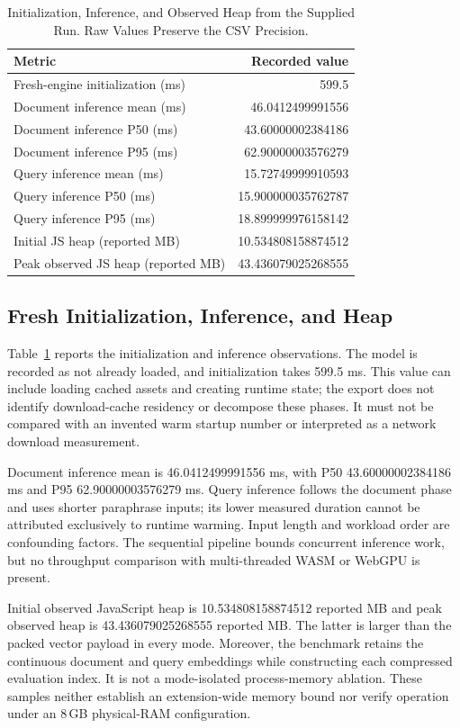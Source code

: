 \documentclass[conference]{IEEEtran}
\newcommand{\mInitialization}{599.5}
\newcommand{\mDocMean}{46.0412499991556}
\newcommand{\mDocMedian}{43.60000002384186}
\newcommand{\mDocTail}{62.90000003576279}
\newcommand{\mQueryMean}{15.72749999910593}
\newcommand{\mQueryMedian}{15.900000035762787}
\newcommand{\mQueryTail}{18.899999976158142}
\newcommand{\mInitialHeap}{10.534808158874512}
\newcommand{\mPeakHeap}{43.436079025268555}
\begin{document}
\begin{table}[!t]
\caption{Initialization, Inference, and Observed Heap from the Supplied Run. Raw Values Preserve the CSV Precision.}
\label{tab:runtime}
\centering
\footnotesize
\setlength{\tabcolsep}{3pt}
\begin{tabular}{@{}lr@{}}
\toprule
Metric & Recorded value\\
\midrule
Fresh-engine initialization (ms) & \mInitialization\\
Document inference mean (ms) & \mDocMean\\
Document inference P50 (ms) & \mDocMedian\\
Document inference P95 (ms) & \mDocTail\\
Query inference mean (ms) & \mQueryMean\\
Query inference P50 (ms) & \mQueryMedian\\
Query inference P95 (ms) & \mQueryTail\\
Initial JS heap (reported MB) & \mInitialHeap\\
Peak observed JS heap (reported MB) & \mPeakHeap\\
\bottomrule
\end{tabular}
\end{table}

\subsection{Fresh Initialization, Inference, and Heap}
Table~\ref{tab:runtime} reports the initialization and inference observations.
The model is recorded as not already loaded, and initialization takes
\mInitialization{} ms. This value can include loading cached assets and
creating runtime state; the export does not identify download-cache residency
or decompose these phases. It must not be compared with an invented warm
startup number or interpreted as a network download measurement.

Document inference mean is \mDocMean{} ms, with P50
\mDocMedian{} ms and P95 \mDocTail{} ms. Query inference follows the document
phase and uses shorter paraphrase inputs; its lower measured duration cannot
be attributed exclusively to runtime warming. Input length and workload
order are confounding factors. The sequential pipeline bounds concurrent
inference work, but no throughput comparison with multi-threaded WASM or
WebGPU is present.

Initial observed JavaScript heap is \mInitialHeap{} reported MB and peak
observed heap is \mPeakHeap{} reported MB. The latter is larger than the
packed vector payload in every mode. Moreover, the benchmark retains the
continuous document and query embeddings while constructing each compressed
evaluation index. It is not a mode-isolated process-memory ablation.
These samples neither establish an extension-wide memory bound nor verify
operation under an 8\,GB physical-RAM configuration.
\end{document}
